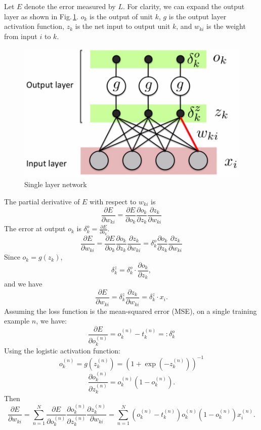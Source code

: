  Let $E$ denote the error measured by $L$. For clarity, we can expand the output layer as shown in Fig.\,\ref{expand2}. $o_k$ is the output of unit $k$, $g$ is the output layer activation function, $z_{k}$ is the net input to output unit $k$, and $w_{ki}$ is the weight from input $i$ to $k$. 
\begin{figure}[h]
	\centering
	\includegraphics[scale=0.5]{Figs/singlelayer2.png}
    \caption{Single layer network}
    \label{expand2}
\end{figure}
The partial derivative of $E$ with respect to $w_{ki}$ is 
$$\frac{\partial E}{\partial w_{ki}} = 
    \frac{\partial E}{\partial o_{k}} 
    \frac{\partial o_{k}}{\partial z_{k}} 
    \frac{\partial z_{k}}{\partial w_{ki}} $$
The error at output $o_k$ is $\delta_k^o =  \frac{\partial E}{\partial o_{k}} $.
$$\frac{\partial E}{\partial w_{ki}} = 
    \frac{\partial E}{\partial o_{k}} 
    \frac{\partial o_{k}}{\partial z_{k}} 
    \frac{\partial z_{k}}{\partial w_{ki}} 
    =  
    \delta_k^o 
    \frac{\partial o_{k}}{\partial z_{k}} 
    \frac{\partial z_{k}}{\partial w_{ki}}  $$
Since $o_k = g(z_k)$, 
$$\delta_k^z = \delta_k^o \cdot \frac{\partial o_{k}}{\partial z_{k}} ,$$
and we have $$\frac{\partial E}{\partial w_{ki}} = \delta_k^z \frac{\partial z_{k}}{\partial w_{ki}} =  \delta_k^z \cdot x_i .$$
Assuming the loss function is the mean-squared error (MSE), on a single training example $n$, we have:
$$\frac{\partial E}{\partial o_k^{(n)}} = o_k^{(n)} - t_k^{(n)} =: \delta_k^o$$
Using the logistic activation function:
$$ o_k^{(n)} = g(z_k^{(n)}) = (1 + \exp(-z_k^{(n)}))^{-1}$$
$$\frac{\partial o_k^{(n)}}{\partial z_k^{(n)}} = o_k^{(n)}(1-o_k^{(n)}).$$
Then
$$\frac{\partial E}{\partial w_{ki}} =  \sum_{n=1}^N \frac{\partial E}{\partial o_{k}^{(n)}}\frac{\partial o_{k}^{(n)}}{\partial z_{k}^{(n)}} \frac{\partial z_{k}^{(n)}}{\partial w_{ki}} = \sum_{n=1}^N (o_k^{(n)} - t_k^{(n)})o_k^{(n)} (1-o_k^{(n)}) x_i^{(n)}.$$

